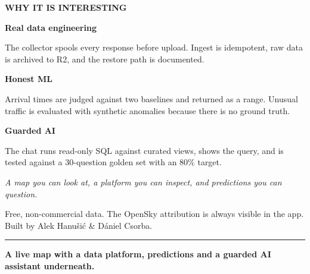 \documentclass[10.5pt]{article}
\begin{document}
\vspace{10pt}
{\color{accent}\fontsize{8.5}{10}\selectfont\bfseries WHY IT IS INTERESTING}

\vspace{3pt}
\begin{minipage}[t]{0.32\linewidth}
\begin{darkcard}[colframe=accent]
{\bfseries Real data engineering}

\vspace{2pt}
{\footnotesize The collector spools every response before upload. Ingest is idempotent, raw data is archived to R2, and the restore path is documented.}
\end{darkcard}
\end{minipage}\hfill
\begin{minipage}[t]{0.32\linewidth}
\begin{darkcard}[colframe=accent]
{\bfseries Honest ML}

\vspace{2pt}
{\footnotesize Arrival times are judged against two baselines and returned as a range. Unusual traffic is evaluated with synthetic anomalies because there is no ground truth.}
\end{darkcard}
\end{minipage}\hfill
\begin{minipage}[t]{0.32\linewidth}
\begin{darkcard}[colframe=accent]
{\bfseries Guarded AI}

\vspace{2pt}
{\footnotesize The chat runs read-only SQL against curated views, shows the query, and is tested against a 30-question golden set with an 80\% target.}
\end{darkcard}
\end{minipage}

\vspace{4pt}
{\color{muted}\fontsize{9}{12}\selectfont\itshape
A map you can look at, a platform you can inspect, and predictions you can question.}

\vfill
{\color{muted}\fontsize{8.5}{11}\selectfont
Free, non-commercial data. The OpenSky attribution is always visible in the app.\\
Built by Alek Hanušić \& Dániel Csorba.\par
\vspace{2pt}
{\color{accent}\rule{1.1cm}{0.9pt}}\quad
\textbf{A live map with a data platform, predictions and a guarded AI assistant underneath.}
}
\end{document}
